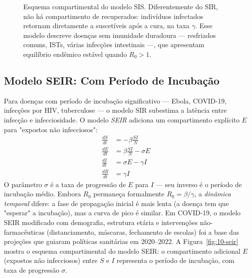 \begin{figure}[htbp]
\centering
{}
\caption{Esquema compartimental do modelo SIS. Diferentemente do SIR, não há compartimento de recuperados: indivíduos infectados retornam diretamente a suscetíveis após a cura, na taxa $\gamma$. Esse modelo descreve doenças sem imunidade duradoura --- resfriados comuns, ISTs, várias infecções intestinais ---, que apresentam equilíbrio endêmico estável quando $R_0 > 1$.}
\label{fig:10-sis}
\end{figure}

\subsection{Modelo SEIR: Com Período de Incubação}
\label{sub:image10-seir}

Para doenças com período de incubação significativo --- Ebola, COVID-19,
infecções por HIV, tuberculose --- o modelo SIR subestima a latência entre
infecção e infecciosidade. O modelo \emph{SEIR} adiciona um compartimento
explícito $E$ para "expostos não infecciosos":
\begin{align}
\frac{dS}{dt} &= -\beta \frac{SI}{N} \\
\frac{dE}{dt} &= \beta \frac{SI}{N} - \sigma E \\
\frac{dI}{dt} &= \sigma E - \gamma I \\
\frac{dR}{dt} &= \gamma I
\end{align}
O parâmetro $\sigma$ é a taxa de progressão de $E$ para $I$ --- seu inverso
é o período de incubação médio. Embora $R_0$ permaneça formalmente
$R_0 = \beta/\gamma$, a \emph{dinâmica temporal} difere: a fase de propagação
inicial é mais lenta (a doença tem que "esperar" a incubação), mas a curva
de pico é similar. Em COVID-19, o modelo SEIR modificado com demografia,
estrutura etária e intervenções não-farmacêuticas (distanciamento, máscaras,
fechamento de escolas) foi a base das projeções que guiaram políticas
sanitárias em 2020--2022. A Figura~\ref{fig:10-seir} mostra o esquema
compartimental do modelo SEIR: o compartimento adicional $E$ (expostos não
infecciosos) entre $S$ e $I$ representa o período de incubação, com taxa de
progressão $\sigma$.

